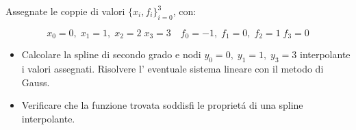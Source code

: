 Assegnate le coppie di valori $\{x_i,f_i \}_{i=0}^3$, con:

$$x_0=0, \; x_1=1, \; x_2=2  \; x_3=3 \quad f_0=-1, \; f_1=0, \; f_2=1  \; f_3=0$$

\begin{itemize}
\item Calcolare la spline di secondo grado e nodi
$y_0=0, \; y_1=1, \; y_3=3$ interpolante i valori assegnati.
Risolvere l' eventuale sistema lineare con il metodo di Gauss.
\item Verificare che la funzione trovata soddisfi le propriet\'a
di una spline interpolante.

\end{itemize}
